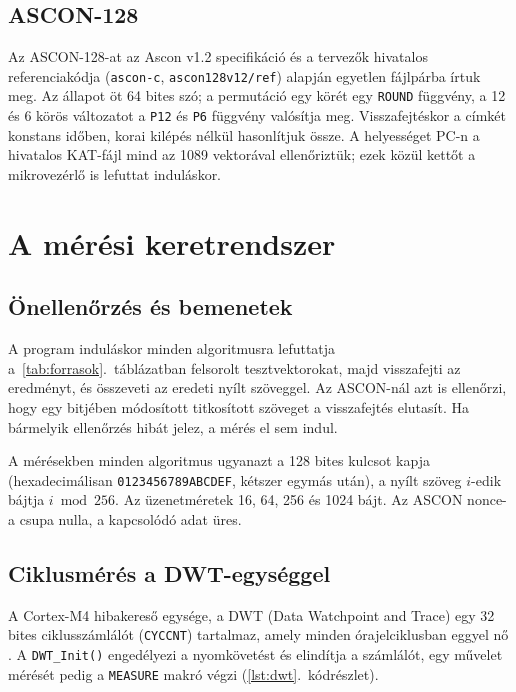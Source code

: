 \documentclass[a4paper,12pt]{report}
\theoremstyle{definition}
\theoremstyle{remark}
\begin{document}
\subsection{ASCON-128}

Az ASCON-128-at az Ascon v1.2 specifikáció \cite{Dobraunig2021} és a tervezők hivatalos referenciakódja (\texttt{ascon-c}, \texttt{ascon128v12/ref}) \cite{AsconC} alapján egyetlen fájlpárba írtuk meg. Az állapot öt 64 bites szó; a permutáció egy körét egy \texttt{ROUND} függvény, a 12 és 6 körös változatot a \texttt{P12} és \texttt{P6} függvény valósítja meg. Visszafejtéskor a címkét konstans időben, korai kilépés nélkül hasonlítjuk össze. A helyességet PC-n a hivatalos KAT-fájl mind az 1089 vektorával ellenőriztük; ezek közül kettőt a mikrovezérlő is lefuttat induláskor.

\section{A mérési keretrendszer}\label{sec:keretrendszer}

\subsection{Önellenőrzés és bemenetek}

A program induláskor minden algoritmusra lefuttatja a~\ref{tab:forrasok}.~táblázatban felsorolt tesztvektorokat, majd visszafejti az eredményt, és összeveti az eredeti nyílt szöveggel. Az ASCON-nál azt is ellenőrzi, hogy egy bitjében módosított titkosított szöveget a visszafejtés elutasít. Ha bármelyik ellenőrzés hibát jelez, a mérés el sem indul.

A mérésekben minden algoritmus ugyanazt a 128 bites kulcsot kapja (hexadecimálisan \texttt{0123456789ABCDEF}, kétszer egymás után), a nyílt szöveg $i$-edik bájtja $i \bmod 256$. Az üzenetméretek 16, 64, 256 és 1024 bájt. Az ASCON nonce-a csupa nulla, a kapcsolódó adat üres.

\subsection{Ciklusmérés a DWT-egységgel}

A Cortex-M4 hibakereső egysége, a DWT (Data Watchpoint and Trace) egy 32 bites ciklusszámlálót (\texttt{CYCCNT}) tartalmaz, amely minden órajelciklusban eggyel nő \cite{ARMCM4}. A \mbox{\texttt{DWT\_Init()}} engedélyezi a nyomkövetést és elindítja a számlálót, egy művelet mérését pedig a \texttt{MEASURE} makró végzi (\ref{lst:dwt}.~kódrészlet).
\end{document}
